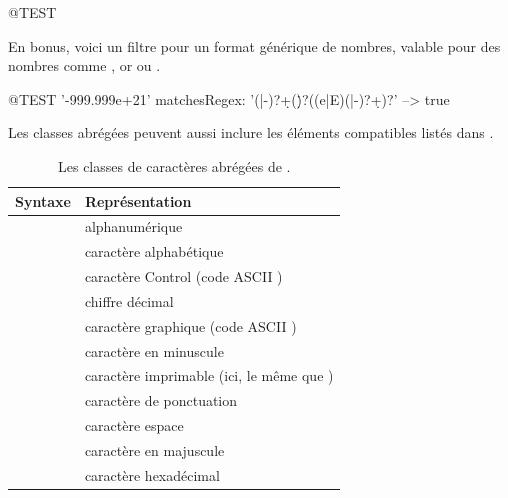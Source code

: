 \documentclass[a4paper,10pt,twoside]{book}
\begin{document}
\begin{code}{@TEST}

En bonus, voici un filtre pour un format générique de nombres, valable
pour des nombres comme , or  ou .
\begin{code}{@TEST}
'-999.999e+21' matchesRegex: '(\+|-)?\d+(\.\d*)?((e|E)(\+|-)?\d+)?' --> true
\end{code}

Les classes abrégées peuvent aussi inclure les éléments compatibles
 listés dans .

\begin{table}[htb]
\centering
	\begin{tabular}{lp{8cm}}
		\toprule
	Syntaxe \pkgregex & Représentation \\
		\midrule
\lct{[:alnum:]} & alphanumérique \\
\lct{[:alpha:]} & caractère alphabétique\\
\lct{[:cntrl:]} & caractère Control (code ASCII \lct{< 32})\\
\lct{[:digit:]} & chiffre décimal\\
\lct{[:graph:]} & caractère graphique (code ASCII \lct{>= 32})\\
\lct{[:lower:]} & caractère en minuscule\\
\lct{[:print:]} & caractère imprimable (ici, le même que \lct{[:graph:]})\\
\lct{[:punct:]} & caractère de ponctuation\\
\lct{[:space:]} & caractère espace\\
\lct{[:upper:]} & caractère en majuscule\\
\lct{[:xdigit:]} & caractère hexadécimal\\
		\bottomrule
	\end{tabular}
	\caption{Les classes de caractères abrégées de \pkgregex.}
\end{table}


\end{code}
\end{document}
